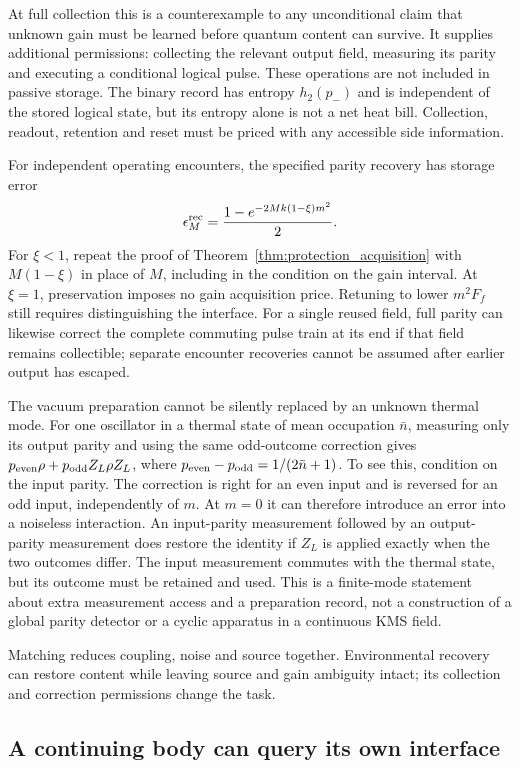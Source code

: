 \documentclass[11pt]{article}
\theoremstyle{definition}
\theoremstyle{remark}
\begin{document}
At full collection this is a counterexample to any unconditional claim
that unknown gain must be learned before quantum content can survive.
It supplies additional permissions: collecting the relevant output field,
measuring its parity and executing a conditional logical pulse. These
operations are not included in passive storage. The binary record has
entropy $h_2(p_-)$ and is independent of the stored logical state, but its
entropy alone is not a net heat bill. Collection, readout, retention and
reset must be priced with any accessible side information.

For independent operating encounters, the specified parity recovery has
storage error
\[
 \epsilon_M^{\rm rec}=\frac{1-e^{-2Mk(1-\xi)m^2}}2.
\]
For $\xi<1$, repeat the proof of
Theorem~\ref{thm:protection_acquisition} with $M(1-\xi)$ in place of $M$,
including in the condition on the gain interval. At $\xi=1$, preservation imposes no gain
acquisition price. Retuning to lower $m^2F_f$ still requires distinguishing
the interface. For a single reused field, full parity can likewise correct
the complete commuting pulse train at its end if that field remains
collectible; separate encounter recoveries cannot be assumed after earlier
output has escaped.

The vacuum preparation cannot be silently replaced by an unknown thermal
mode. For one oscillator in a thermal state of mean occupation
$\bar n$, measuring only its output parity and using the same odd-outcome
correction gives $p_{\rm even}\rho+p_{\rm odd}Z_L\rho Z_L$, where
$p_{\rm even}-p_{\rm odd}=1/(2\bar n+1)$. To see this, condition on
the input parity. The correction is right for an even input and is
reversed for an odd input, independently of $m$. At $m=0$ it can therefore
introduce an error into a noiseless interaction. An input-parity
measurement followed by an output-parity measurement does restore the
identity if $Z_L$ is applied exactly when the two outcomes differ. The
input measurement commutes with the thermal state, but its outcome must
be retained and used. This is a finite-mode statement about extra
measurement access and a preparation record, not a construction of a
global parity detector or a cyclic apparatus in a continuous KMS field.

Matching reduces coupling, noise and source together. Environmental recovery can restore content while leaving source and gain ambiguity intact; its collection and correction permissions change the task.

\subsection{A continuing body can query its own interface}
\label{sec:continuing-body}
\end{document}
